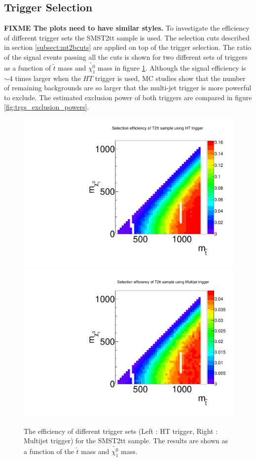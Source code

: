 \subsection{Trigger Selection}
\label{sect:triggerselection}
{\bf FIXME The plots need to have similar styles.}
To investigate the efficiency of different trigger sets the SMST2tt sample is used. The selection cuts described in section \ref{subsect:mt2bcuts} are applied on top of the trigger selection. The ratio of the signal events passing all the cuts is shown for two different sets of triggers as a function of $\tilde{t}$ mass and $\tilde{\chi^0_1}$ mass in figure \ref{fig:trg_eff}. Although the signal efficiency is $\sim 4$ times larger when the $HT$ trigger is used, MC studies show that the number of remaining backgrounds are so larger that the multi-jet trigger is more powerful to exclude. The estimated exclusion power of both triggers are compared in figure \ref{fig:trgs_exclusion_powers}.

\begin{figure}[htbp] 
\centering
\includegraphics[angle=0,scale=0.39]{figs/HT_eff.pdf}
\includegraphics[angle=0,scale=0.39]{figs/multijet_eff.pdf} \\
\caption{The efficiency of different trigger sets (Left : HT trigger, Right : Multijet trigger) for the SMST2tt sample. The results are shown as a function of the $\tilde{t}$ mass and $\tilde{\chi^0_1}$ mass.}
\label{fig:trg_eff}
\end{figure}

